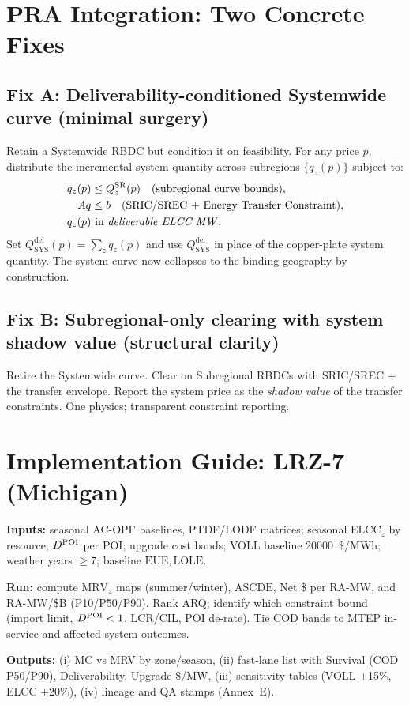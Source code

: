 \documentclass[11pt]{article}
\newcommand{\ELCC}{\ensuremath{\mathrm{ELCC}}}
\newcommand{\EUE}{\ensuremath{\mathrm{EUE}}}
\newcommand{\LOLE}{\ensuremath{\mathrm{LOLE}}}
\newcommand{\ASCDE}{\ensuremath{\mathrm{ASCDE}}}
\newcommand{\MRV}{\ensuremath{\mathrm{MRV}}}
\numberwithin{equation}{section}
\theoremstyle{definition}
\theoremstyle{remark}
\begin{document}
\section{PRA Integration: Two Concrete Fixes}
\subsection{Fix A: Deliverability-conditioned Systemwide curve (minimal surgery)}
Retain a Systemwide RBDC but condition it on feasibility. For any price $p$, distribute the incremental system quantity across subregions $\{q_z(p)\}$ subject to:
\begin{align}
q_z(p) &\le Q^{\text{SR}}_z(p)\quad \text{(subregional curve bounds)},\\
Aq &\le b \quad \text{(SRIC/SREC + Energy Transfer Constraint)},\\
q_z(p) &\text{ in \emph{deliverable ELCC MW}}.
\end{align}
Set $Q^{\text{del}}_{\text{SYS}}(p)=\sum_z q_z(p)$ and use $Q^{\text{del}}_{\text{SYS}}$ in place of the copper-plate system quantity. The system curve now collapses to the binding geography by construction.

\subsection{Fix B: Subregional-only clearing with system shadow value (structural clarity)}
Retire the Systemwide curve. Clear on Subregional RBDCs with SRIC/SREC + the transfer envelope. Report the system price as the \emph{shadow value} of the transfer constraints. One physics; transparent constraint reporting.

\section{Implementation Guide: LRZ-7 (Michigan)}
\textbf{Inputs:} seasonal AC-OPF baselines, PTDF/LODF matrices; seasonal $\ELCC_{z}$ by resource; $\Ddel$ per POI; upgrade cost bands; VOLL baseline \SI{20000}{\$}/MWh; weather years $\ge 7$; baseline $\EUE,\LOLE$.

\textbf{Run:} compute $\MRV_z$ maps (summer/winter), \ASCDE, Net \$ per RA-MW, and RA-MW/\$B (P10/P50/P90). Rank ARQ; identify which constraint bound (import limit, $\Ddel<1$, LCR/CIL, POI de-rate). Tie COD bands to MTEP in-service and affected-system outcomes.

\textbf{Outputs:} (i) MC vs MRV by zone/season, (ii) fast-lane list with Survival (COD P50/P90), Deliverability, Upgrade \$/MW, (iii) sensitivity tables (VOLL $\pm$15\%, ELCC $\pm$20\%), (iv) lineage and QA stamps (Annex~E).
\end{document}
